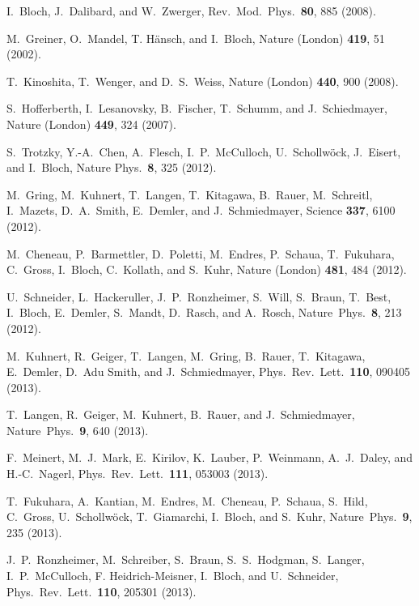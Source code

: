 \documentclass[11pt]{iopart}
\begin{document}
\begin{thebibliography}{99}

I.~Bloch, J.~Dalibard, and W.~Zwerger, Rev.\ Mod.\ Phys.\ {\bf 80},
885 (2008).

M.~Greiner, O.~Mandel, T. H\"ansch, and I.~Bloch, Nature (London)
{\bf 419}, 51 (2002).

T.~Kinoshita, T.~Wenger, and D.~S.~Weiss, Nature (London) {\bf 440},
900 (2008).

S.~Hofferberth, I.~Lesanovsky, B.~Fischer, T.~Schumm, and J.~Schiedmayer,
Nature (London) {\bf 449}, 324 (2007).

S.~Trotzky, Y.-A.~Chen, A.~Flesch, I.~P.~McCulloch, U.~Schollw\"ock,
J.~Eisert, and I.~Bloch, Nature Phys.\ {\bf 8}, 325 (2012).

M.~Gring, M.~Kuhnert, T.~Langen, T.~Kitagawa, B.~Rauer, M.~Schreitl,
I.~Mazets, D.~A.~Smith, E.~Demler, and J.~Schmiedmayer, Science {\bf 337},
6100 (2012).

M.~Cheneau, P.~Barmettler, D.~Poletti, M.~Endres, P.~Schaua, T.~Fukuhara,
C.~Gross, I.~Bloch, C.~Kollath, and S.~Kuhr, Nature (London) {\bf 481},
484 (2012).

U.~Schneider, L.~Hackeruller, J.~P.~Ronzheimer, S.~Will, S.~Braun, T.~Best,
I.~Bloch, E.~Demler, S.~Mandt, D.~Rasch, and A.~Rosch, Nature\ Phys.\
{\bf 8}, 213 (2012).

M.~Kuhnert, R.~Geiger, T.~Langen, M.~Gring, B.~Rauer,
T.~Kitagawa, E.~Demler, D.~Adu Smith, and J.~Schmiedmayer, Phys.\ Rev.\
Lett.\ {\bf 110}, 090405 (2013).

T.~Langen, R.~Geiger, M.~Kuhnert, B.~Rauer, and J.~Schmiedmayer,
Nature\ Phys.\ {\bf 9}, 640 (2013).

F.~Meinert, M.~J.~Mark, E.~Kirilov, K.~Lauber, P.~Weinmann,
A.~J.~Daley, and H.-C.~Nagerl, Phys.\ Rev.\ Lett.\ {\bf 111},
053003 (2013).

T.~Fukuhara, A.~Kantian, M.~Endres, M.~Cheneau, P.~Schaua, S.~Hild, C.~Gross,
U.~Schollw\"ock, T.~Giamarchi, I.~Bloch, and S.~Kuhr, Nature\ Phys.\ {\bf 9},
235 (2013).

J.~P.~Ronzheimer, M.~Schreiber, S.~Braun, S.~S.~Hodgman, S.~Langer, I.~P.~McCulloch,
F. Heidrich-Meisner, I.~Bloch, and U.~Schneider, Phys.\ Rev.\ Lett.\ {\bf 110},
205301 (2013).


\end{thebibliography}
\end{document}
